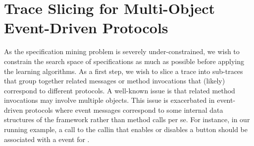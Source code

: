 \documentclass[10pt,reprint,nocopyrightspace,numbers]{sigplanconf}
\begin{document}
\section{Trace Slicing for Multi-Object Event-Driven Protocols}
\label{sec:slicing}


As the specification mining problem is severely under-constrained,
we wish to constrain the search space of specifications as much as possible before applying the learning algorithms.
%
As a first step,
we wish to slice a trace into sub-traces that group together related messages or method invocations that (likely) correspond to different protocols.
A well-known issue is that related method invocations may involve multiple objects.
This issue is exacerbated in event-driven protocols where event messages correspond to some internal data structures of the framework rather than method calls per se.
For instance, in our running example, a call to the callin  that enables or disables a button  should be associated with a  event for .
\end{document}
